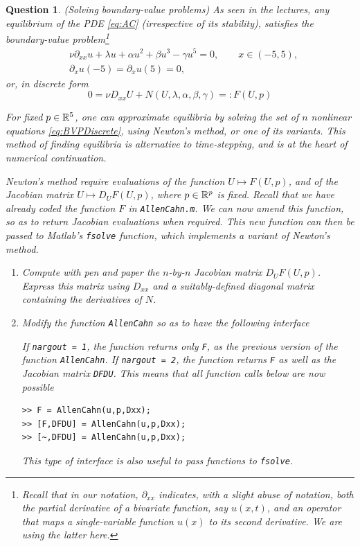 \documentclass[a4paper]{siamart220329}
\theoremstyle{plain}
\newtheorem{question}{Question}
\begin{document}
\begin{question}(Solving boundary-value problems) \label{question:fsolve}
  As seen in the lectures, any
  equilibrium of the PDE \cref{eq:AC} (irrespective of its stability), satisfies the
  boundary-value problem\footnote{Recall that in our notation, $\partial_{xx}$
  indicates, with a slight abuse of notation, both the partial derivative of a
  bivariate function, say $u(x,t)$, and an operator that maps a single-variable
function $u(x)$ to its second derivative. We are using the latter here.}
  \begin{equation}\label{eq:BVP}
    \begin{aligned}
      & \nu \partial_{xx}u + \lambda u + \alpha u^2 + \beta u^3 - \gamma u^5 = 0, \qquad x \in (-5,5), \\
      & \partial_x u(-5) = \partial_x u(5) = 0, 
    \end{aligned}
  \end{equation}
  or, in discrete form
  \begin{equation}\label{eq:BVPDiscrete}
    0 = \nu D_{xx}U + N(U,\lambda,\alpha,\beta,\gamma) =: F(U,p)
  \end{equation}

  For fixed $p \in \mathbb{R}^5$, one can approximate equilibria by solving the set of $n$
  nonlinear equations \cref{eq:BVPDiscrete}, using Newton's method, or one of its
  variants. This method of finding equilibria is alternative to time-stepping, and is
  at the heart of numerical continuation.

  Newton's method require evaluations of the function $U \mapsto F(U,p)$, and of the
  Jacobian matrix $U \mapsto D_UF(U,p)$, where $p \in
  \mathbb{R}^p$ is fixed.
%
  Recall that we have already coded the function $F$ in
  \lstinline|AllenCahn.m|. We can now amend this function, so as to return Jacobian
  evaluations when required. This new function can then be passed to Matlab's
  \lstinline|fsolve| function, which implements a variant of Newton's method. 

  \begin{enumerate}
    \item Compute with pen and paper the $n$-by-$n$ Jacobian matrix $D_U F(U,p)$.
      Express this matrix using $D_{xx}$ and a suitably-defined diagonal matrix
      containing the derivatives of $N$.

    \item Modify the function \lstinline|AllenCahn| so as to have the following
      interface 
      
      If \lstinline|nargout = 1|, the function returns only \lstinline|F|, as the previous
      version of the function \lstinline|AllenCahn|. If \lstinline|nargout = 2|, the function
      returns \lstinline|F| as well as the Jacobian matrix \lstinline|DFDU|. This
      means that all function calls below are now possible
\begin{lstlisting}[numbers=none]
>> F = AllenCahn(u,p,Dxx);
>> [F,DFDU] = AllenCahn(u,p,Dxx);
>> [~,DFDU] = AllenCahn(u,p,Dxx);
\end{lstlisting}
     This type of interface is also useful to pass functions to \lstinline|fsolve|.


\end{enumerate}
\end{question}
\end{document}
